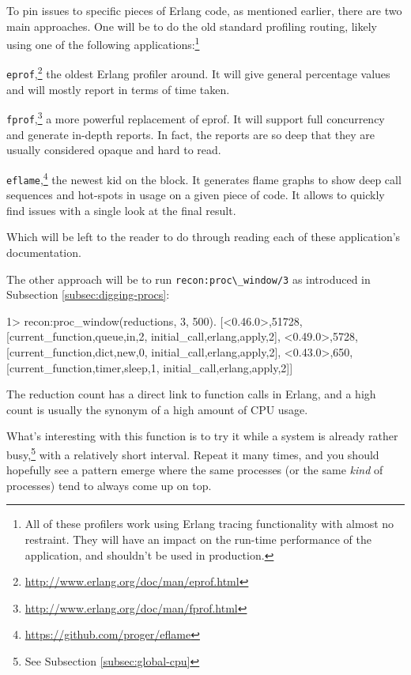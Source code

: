 \documentclass[11pt, oneside]{book}   	%
\newcommand{\otpapp}[1]{\Verb`#1`}
\newcommand{\function}[1]{\Verb`#1`}
\begin{document}
To pin issues to specific pieces of Erlang code, as mentioned earlier, there are two main approaches. One will be to do the old standard profiling routing, likely using one of the following applications:\footnote{All of these profilers work using Erlang tracing functionality with almost no restraint. They will have an impact on the run-time performance of the application, and shouldn't be used in production.}

\begin{itemize*}
	\item \otpapp{eprof},\footnote{\href{http://www.erlang.org/doc/man/eprof.html}{http://www.erlang.org/doc/man/eprof.html}} the oldest Erlang profiler around. It will give general percentage values and will mostly report in terms of time taken.
	\item \otpapp{fprof},\footnote{\href{http://www.erlang.org/doc/man/fprof.html}{http://www.erlang.org/doc/man/fprof.html}} a more powerful replacement of eprof. It will support full concurrency and generate in-depth reports. In fact, the reports are so deep that they are usually considered opaque and hard to read. 
	\item \otpapp{eflame},\footnote{\href{https://github.com/proger/eflame}{https://github.com/proger/eflame}} the newest kid on the block. It generates flame graphs to show deep call sequences and hot-spots in usage on a given piece of code. It allows to quickly find issues with a single look at the final result.
\end{itemize*}

Which will be left to the reader to do through reading each of these application's documentation.

The other approach will be to run \function{recon:proc\_window/3} as introduced in Subsection \ref{subsec:digging-procs}:

\begin{VerbatimEshell}
1> recon:proc_window(reductions, 3, 500).
[{<0.46.0>,51728,
  [{current_function,{queue,in,2}},
   {initial_call,{erlang,apply,2}}]},
 {<0.49.0>,5728,
  [{current_function,{dict,new,0}},
   {initial_call,{erlang,apply,2}}]},
 {<0.43.0>,650,
  [{current_function,{timer,sleep,1}},
   {initial_call,{erlang,apply,2}}]}]
\end{VerbatimEshell}

The reduction count has a direct link to function calls in Erlang, and a high count is usually the synonym of a high amount of CPU usage. 

What's interesting with this function is to try it while a system is already rather busy,\footnote{See Subsection \ref{subsec:global-cpu}} with a relatively short interval. Repeat it many times, and you should hopefully see a pattern emerge where the same processes (or the same \emph{kind} of processes) tend to always come up on top.
\end{document}
